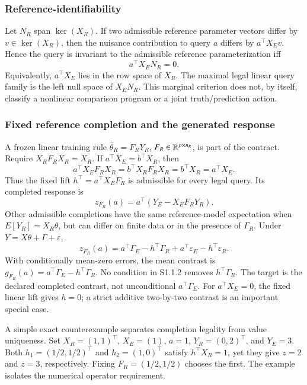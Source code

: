 \documentclass[11pt]{article}
\begin{document}
\subsubsection{Reference-identifiability}
Let $N_R$ span $\ker(X_R)$. If two admissible reference parameter vectors differ by $v\in\ker(X_R)$, then the nuisance contribution to query $a$ differs by $a^\top X_Ev$. Hence the query is invariant to the admissible reference parameterization iff
\[
a^\top X_EN_R=0.
\]
Equivalently, $a^\top X_E$ lies in the row space of $X_R$. The maximal legal linear query family is the left null space of $X_EN_R$. This marginal criterion does not, by itself, classify a nonlinear comparison program or a joint truth/prediction action.

\subsubsection{Fixed reference completion and the generated response}
A frozen linear training rule $\widehat\theta_R=F_RY_R$, $F_R\in\mathbb{R}^{p\times n_R}$, is part of the contract. Require $X_RF_RX_R=X_R$. If $a^\top X_E=b^\top X_R$, then
\[
a^\top X_EF_RX_R=b^\top X_RF_RX_R=b^\top X_R=a^\top X_E.
\]
Thus the fixed lift $h^\top=a^\top X_EF_R$ is admissible for every legal query. Its completed response is
\[
z_{F_R}(a)=a^\top(Y_E-X_EF_RY_R).
\]
Other admissible completions have the same reference-model expectation when $E[Y_R]=X_R\theta$, but can differ on finite data or in the presence of $\Gamma_R$. Under $Y=X\theta+\Gamma+\varepsilon$,
\[
z_{F_R}(a)=a^\top\Gamma_E-h^\top\Gamma_R
          +a^\top\varepsilon_E-h^\top\varepsilon_R.
\]
With conditionally mean-zero errors, the mean contrast is $g_{F_R}(a)=a^\top\Gamma_E-h^\top\Gamma_R$. No condition in S1.1.2 removes $h^\top\Gamma_R$. The target is the declared completed contrast, not unconditional $a^\top\Gamma_E$. For $a^\top X_E=0$, the fixed linear lift gives $h=0$; a strict additive two-by-two contrast is an important special case.

A simple exact counterexample separates completion legality from value uniqueness. Set $X_R=(1,1)^\top$, $X_E=(1)$, $a=1$, $Y_R=(0,2)^\top$, and $Y_E=3$. Both $h_1=(1/2,1/2)^\top$ and $h_2=(1,0)^\top$ satisfy $h^\top X_R=1$, yet they give $z=2$ and $z=3$, respectively. Fixing $F_R=(1/2,1/2)$ chooses the first. The example isolates the numerical operator requirement.
\end{document}
